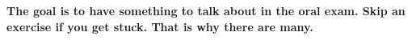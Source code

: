 \textbf{
The goal is to have something to talk about in the oral exam.  Skip an exercise
if you get stuck. That is why there are many.
}